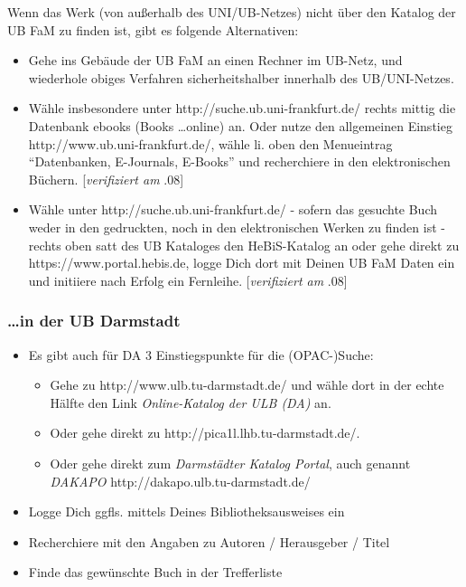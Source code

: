 \documentclass[DIV=calc,BCOR=5mm,11pt,headings=small,oneside,abstract=false, toc=bib]{scrartcl}
\begin{document}
Wenn das Werk (von außerhalb des UNI/UB-Netzes) nicht über den Katalog der
UB FaM zu finden ist, gibt es folgende Alternativen:

\begin{itemize}
  \item Gehe ins Gebäude der UB FaM an einen Rechner im UB-Netz, und wiederhole
  obiges Verfahren sicherheitshalber innerhalb des UB/UNI-Netzes. \item Wähle
  insbesondere unter {\ttfamily http://suche.ub.uni-frankfurt.de/} rechts mittig
  die Datenbank ebooks (Books \ldots online) an. Oder nutze den allgemeinen
  Einstieg {\ttfamily http://www.ub.uni-frankfurt.de/}, wähle li. oben den
  Menueintrag \enquote{Datenbanken, E-Journals, E-Books} und recherchiere
  in den elektronischen Büchern.  [\emph{verifiziert am} {.08}]
  \item Wähle unter {\ttfamily http://suche.ub.uni-frankfurt.de/} - sofern das
  gesuchte Buch weder in den gedruckten, noch in den elektronischen Werken zu
  finden ist - rechts oben satt des UB Kataloges den HeBiS-Katalog an oder gehe
  direkt zu {\ttfamily https://www.portal.hebis.de}, logge Dich dort mit Deinen
  UB FaM Daten ein und initiiere nach Erfolg ein Fernleihe.  [\emph{verifiziert
  am} {.08}]
\end{itemize}

\subsubsection{\ldots in der UB Darmstadt}

\begin{itemize}
  \item Es gibt auch für DA 3 Einstiegspunkte für die (OPAC-)Suche:
  \begin{itemize}
  \item Gehe zu {\ttfamily http://www.ulb.tu-darmstadt.de/} und wähle dort
  in der echte Hälfte den Link \emph{Online-Katalog der ULB (DA)} an.
  \item Oder gehe direkt zu {\ttfamily http://pica1l.lhb.tu-darmstadt.de/}.
  \item Oder gehe direkt zum \emph{Darmstädter Katalog Portal}, auch genannt
  \emph{DAKAPO} {\ttfamily http://dakapo.ulb.tu-darmstadt.de/}
  \end{itemize}
  \item Logge Dich ggfls. mittels Deines Bibliotheksausweises ein
  \item Recherchiere mit den Angaben zu Autoren / Herausgeber / Titel
  \item Finde das gewünschte Buch in der Trefferliste
\end{itemize}
\end{document}

